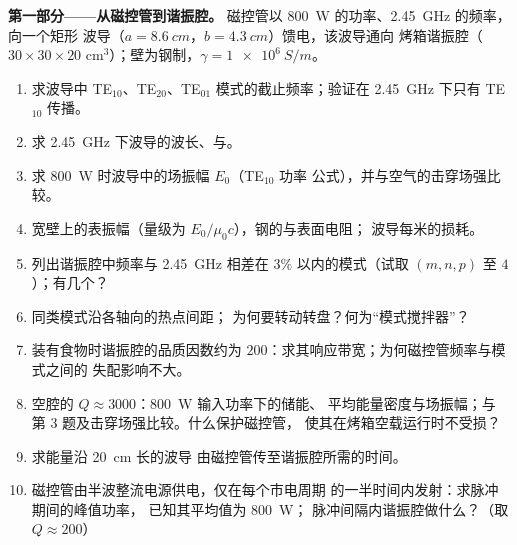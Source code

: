 \begin{problem}
\label{pb:b2:guided-waves:1}

\medskip
\noindent\textbf{第一部分——从磁控管到谐振腔。}
磁控管以 \qty{800}{W} 的功率、\qty{2.45}{GHz} 的频率，向一个矩形
波导（$a = \qty{8.6}{cm}$，$b = \qty{4.3}{cm}$）馈电，该波导通向
烤箱谐振腔（$30 \times 30 \times 20$ cm$^3$）；壁为钢制，$\gamma = \qty{1e6}{S/m}$。
\begin{enumerate}
  \item 求波导中 TE$_{10}$、TE$_{20}$、TE$_{01}$
        模式的截止频率；验证在 \qty{2.45}{GHz} 下只有 TE$_{10}$ 传播。
  \item 求 \qty{2.45}{GHz} 下波导的波长、与。
  \item 求 \qty{800}{W} 时波导中的场振幅 $E_0$（TE$_{10}$ 功率
        公式），并与空气的击穿场强比较。
  \item 宽壁上的表振幅（量级为
        $E_0/\mu_0c$），钢的与表面电阻；
        波导每米的损耗。
  \item 列出谐振腔中频率与
        \qty{2.45}{GHz} 相差在 $3\%$ 以内的模式（试取 $(m, n, p)$ 至 $4$）；有几个？
  \item 同类模式沿各轴向的热点间距；
        为何要转动转盘？何为“模式搅拌器”？
  \item 装有食物时谐振腔的品质因数约为
        $200$：求其响应带宽；为何磁控管频率与模式之间的
        失配影响不大。
  \item 空腔的 $Q \approx 3000$：\qty{800}{W} 输入功率下的储能、
        平均能量密度与场振幅；与
        第 3 题及击穿场强比较。什么保护磁控管，
        使其在烤箱空载运行时不受损？
  \item 求能量沿 \qty{20}{cm} 长的波导
        由磁控管传至谐振腔所需的时间。
  \item 磁控管由半波整流电源供电，仅在每个市电周期
        的一半时间内发射：求脉冲期间的峰值功率，
        已知其平均值为 \qty{800}{W}；
        脉冲间隔内谐振腔做什么？（取 $Q \approx 200$）
\end{enumerate}


\end{problem}
